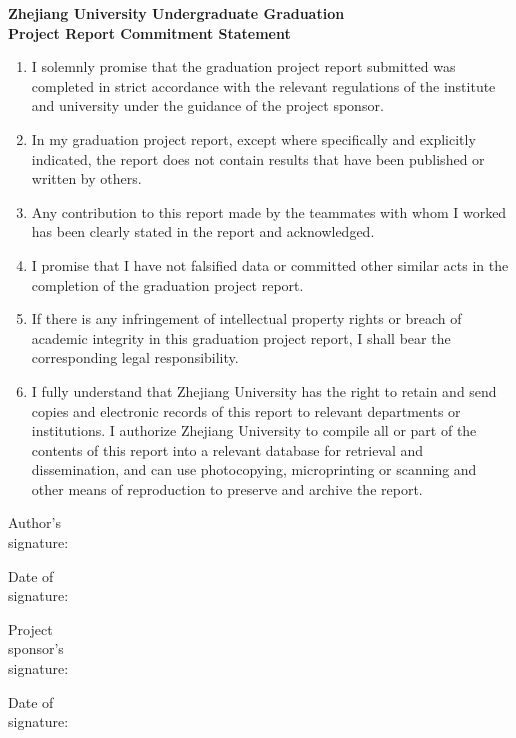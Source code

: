 \thispagestyle{empty}
\begin{center}
    \fontsize{16}{24}\selectfont
    \LARGE\bfseries Zhejiang University Undergraduate Graduation\\
    Project Report Commitment Statement
\end{center}
\vspace{3em}
{\large\fontsize{12}{18}\selectfont
\begin{enumerate}
    \item I solemnly promise that the graduation project report submitted was completed in strict accordance with the relevant regulations of the institute and university under the guidance of the project sponsor.
    \item In my graduation project report, except where specifically and explicitly indicated, the report does not contain results that have been published or written by others.
    \item Any contribution to this report made by the teammates with whom I worked has been clearly stated in the report and acknowledged.
    \item I promise that I have not falsified data or committed other similar acts in the completion of the graduation project report.
    \item If there is any infringement of intellectual property rights or breach of academic integrity in this graduation project report, I shall bear the corresponding legal responsibility.
    \item I fully understand that Zhejiang University has the right to retain and send copies and electronic records of this report to relevant departments or institutions. I authorize Zhejiang University to compile all or part of the contents of this report into a relevant database for retrieval and dissemination, and can use photocopying, microprinting or scanning and other means of reproduction to preserve and archive the report.
\end{enumerate}
}
\vfill
\begin{center}
    \fontsize{14}{21}\selectfont
    \hfill
    \begin{minipage}{0.46\linewidth}
        Author's\\
        signature:\\
        \vspace{2em}
    
        Date of\\
        signature:
    \end{minipage}
    \hfill
    \begin{minipage}{0.4\linewidth}
        Project\\
        sponsor's\\
        signature:\\
        \vspace{1em}
    
        Date of\\
        signature:
    \end{minipage}
    \vspace{2em}
\end{center}
\normalsize
\clearpage